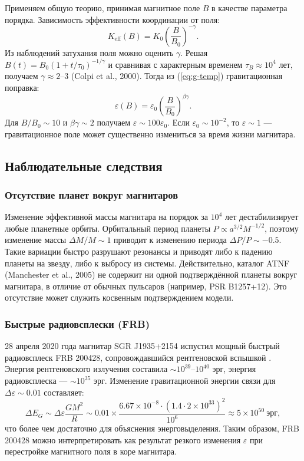 \documentclass[12pt]{article}
\theoremstyle{remark}
\newcommand{\Keff}{K_{\mathrm{eff}}}
\newcommand{\eps}{\varepsilon}
\begin{document}
	Применяем общую теорию, принимая магнитное поле $B$ в качестве параметра порядка. Зависимость эффективности координации от поля:
	\begin{equation}
		\Keff(B) = K_0 \left( \frac{B}{B_0} \right)^{-\gamma}.
		\label{eq:keff-b}
	\end{equation}
	Из наблюдений затухания поля можно оценить $\gamma$. Решая $B(t) = B_0 (1 + t/\tau_0)^{-1/\gamma}$ и сравнивая с характерным временем $\tau_B \approx 10^4$ лет, получаем $\gamma \approx 2$–$3$ (Colpi et al., 2000). Тогда из (\ref{eq:g-temp}) гравитационная поправка:
	\begin{equation}
		\eps(B) = \eps_0 \left( \frac{B}{B_0} \right)^{\beta\gamma}.
		\label{eq:eps-b}
	\end{equation}
	Для $B/B_0 \sim 10$ и $\beta\gamma \sim 2$ получаем $\eps \sim 100 \eps_0$. Если $\eps_0 \sim 10^{-2}$, то $\eps \sim 1$ — гравитационное поле может существенно измениться за время жизни магнитара.
	
	\subsection{Наблюдательные следствия}
	\label{subsec:magnetars-consequences}
	
	\subsubsection{Отсутствие планет вокруг магнитаров}
	\label{subsubsec:magnetars-planets}
	
	Изменение эффективной массы магнитара на порядок за $10^4$ лет дестабилизирует любые планетные орбиты. Орбитальный период планеты $P \propto a^{3/2} M^{-1/2}$, поэтому изменение массы $\Delta M/M \sim 1$ приводит к изменению периода $\Delta P/P \sim -0.5$. Такие вариации быстро разрушают резонансы и приводят либо к падению планеты на звезду, либо к выбросу из системы. Действительно, каталог ATNF (Manchester et al., 2005) не содержит ни одной подтверждённой планеты вокруг магнитара, в отличие от обычных пульсаров (например, PSR B1257+12). Это отсутствие может служить косвенным подтверждением модели.
	
	\subsubsection{Быстрые радиовсплески (FRB)}\label{subsec:magnetars-frb}
	
	28 апреля 2020 года магнитар SGR J1935+2154 испустил мощный быстрый радиовсплеск FRB 200428, сопровождавшийся рентгеновской вспышкой \cite{Geng2020}. Энергия рентгеновского излучения составила $\sim 10^{39}$–$10^{40}$ эрг, энергия радиовсплеска — $\sim 10^{35}$ эрг. Изменение гравитационной энергии связи для $\Delta\eps \sim 0.01$ составляет:
	\begin{equation}
		\Delta E_G \sim \Delta\eps \frac{GM^2}{R} \sim 0.01 \times \frac{6.67\times10^{-8} \cdot (1.4\cdot 2\times10^{33})^2}{10^6} \approx 5\times10^{50}\ \text{эрг},
	\end{equation}
	что более чем достаточно для объяснения энерговыделения. Таким образом, FRB 200428 можно интерпретировать как результат резкого изменения $\eps$ при перестройке магнитного поля в коре магнитара.
	
\end{document}
